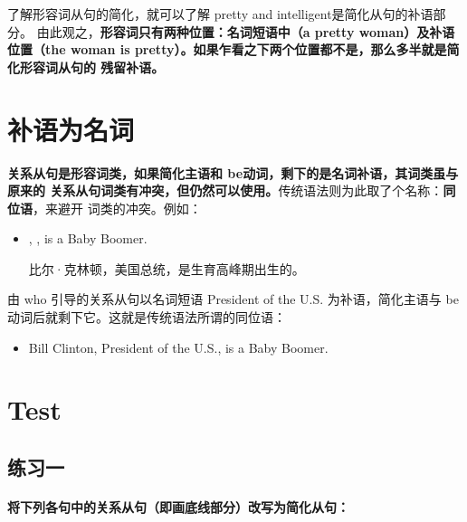了解形容词从句的简化，就可以了解 pretty and intelligent是简化从句的补语部分。
由此观之，\textbf{形容词只有两种位置：名词短语中（a pretty woman）及补语位置（the
  woman is pretty）。如果乍看之下两个位置都不是，那么多半就是简化形容词从句的
  残留补语。}

\section{补语为名词}

\textbf{关系从句是形容词类，如果简化主语和 be动词，剩下的是名词补语，其词类虽与原来的
关系从句词类有冲突，但仍然可以使用。}传统语法则为此取了个名称：\textbf{同位语}，来避开
词类的冲突。例如：
\begin{itemize}
\item {}, ,
  is a Baby Boomer.

  比尔·克林顿，美国总统，是生育高峰期出生的。
\end{itemize}
由 who 引导的关系从句以名词短语 President of the U.S. 为补语，简化主语与
be 动词后就剩下它。这就是传统语法所谓的同位语：
\begin{itemize}
\item Bill Clinton, President of the U.S., is a Baby Boomer.
\end{itemize}

\section{Test}

\subsection{练习一}

\paragraph{将下列各句中的关系从句（即画底线部分）改写为简化从句：}

